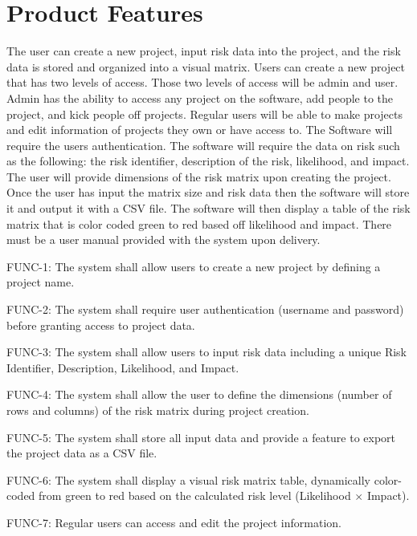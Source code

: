 \documentclass[letterpaper,12pt,oneside,listof=totoc,parskip=full]{scrreprt}
\begin{document}
\section{Product Features}
The user can create a new project, input risk data into the project, and the risk data is stored and organized into a visual matrix. Users can create a new project that has two levels of access. Those two levels of access will be admin and user. Admin has the ability to access any project on the software, add people to the project, and kick people off projects. Regular users will be able to make projects and edit information of projects they own or have access to. The Software will require the users authentication. The software will require the data on risk such as the following: the risk identifier, description of the risk, likelihood, and impact. The user will provide dimensions of the risk matrix upon creating the project. Once the user has input the matrix size and risk data then the software will store it and output it with a CSV file. The software will then display a table of the risk matrix that is color coded green to red based off likelihood and impact. There must be a user manual provided with the system upon delivery.

FUNC-1: The system shall allow users to create a new project by defining a project name.

FUNC-2: The system shall require user authentication (username and password) before granting access to project data.

FUNC-3: The system shall allow users to input risk data including a unique Risk Identifier, Description, Likelihood, and Impact.

FUNC-4: The system shall allow the user to define the dimensions (number of rows and columns) of the risk matrix during project creation.

FUNC-5: The system shall store all input data and provide a feature to export the project data as a CSV file.

FUNC-6: The system shall display a visual risk matrix table, dynamically color-coded from green to red based on the calculated risk level (Likelihood $\times$ Impact).

FUNC-7: Regular users can access and edit the project information.
\end{document}
